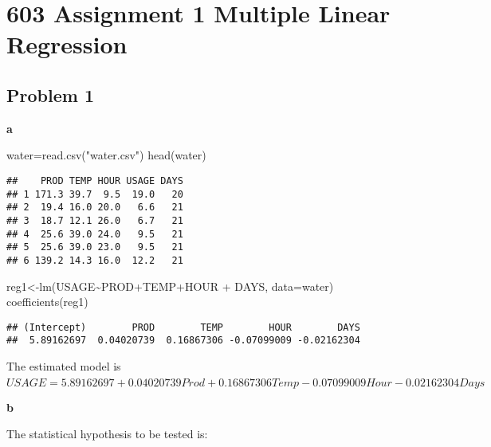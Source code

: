 \documentclass[
]{article}
\author{}
\date{\vspace{-2.5em}}
\newenvironment{Shaded}{\begin{snugshade}}{\end{snugshade}}
\newcommand{\AttributeTok}[1]{\textcolor[rgb]{0.77,0.63,0.00}{#1}}
\newcommand{\FunctionTok}[1]{\textcolor[rgb]{0.00,0.00,0.00}{#1}}
\newcommand{\NormalTok}[1]{#1}
\newcommand{\OtherTok}[1]{\textcolor[rgb]{0.56,0.35,0.01}{#1}}
\newcommand{\SpecialCharTok}[1]{\textcolor[rgb]{0.00,0.00,0.00}{#1}}
\newcommand{\StringTok}[1]{\textcolor[rgb]{0.31,0.60,0.02}{#1}}
\begin{document}
\hypertarget{assignment-1-multiple-linear-regression}{%
\section{603 Assignment 1 Multiple Linear
Regression}\label{assignment-1-multiple-linear-regression}}

\hypertarget{problem-1}{%
\subsection{Problem 1}\label{problem-1}}

\textbf{a}

\begin{Shaded}
\begin{Highlighting}[]
\NormalTok{water}\OtherTok{=}\FunctionTok{read.csv}\NormalTok{(}\StringTok{"water.csv"}\NormalTok{)}
\FunctionTok{head}\NormalTok{(water)}
\end{Highlighting}
\end{Shaded}

\begin{verbatim}
##    PROD TEMP HOUR USAGE DAYS
## 1 171.3 39.7  9.5  19.0   20
## 2  19.4 16.0 20.0   6.6   21
## 3  18.7 12.1 26.0   6.7   21
## 4  25.6 39.0 24.0   9.5   21
## 5  25.6 39.0 23.0   9.5   21
## 6 139.2 14.3 16.0  12.2   21
\end{verbatim}

\begin{Shaded}
\begin{Highlighting}[]
\NormalTok{reg1}\OtherTok{\textless{}{-}}\FunctionTok{lm}\NormalTok{(USAGE}\SpecialCharTok{\textasciitilde{}}\NormalTok{PROD}\SpecialCharTok{+}\NormalTok{TEMP}\SpecialCharTok{+}\NormalTok{HOUR }\SpecialCharTok{+}\NormalTok{ DAYS, }\AttributeTok{data=}\NormalTok{water)}
\FunctionTok{coefficients}\NormalTok{(reg1)}
\end{Highlighting}
\end{Shaded}

\begin{verbatim}
## (Intercept)        PROD        TEMP        HOUR        DAYS 
##  5.89162697  0.04020739  0.16867306 -0.07099009 -0.02162304
\end{verbatim}

The estimated model is
\(\hat{USAGE}= 5.89162697 +0.04020739Prod+0.16867306Temp-0.07099009Hour -0.02162304Days\)

\textbf{b}

The statistical hypothesis to be tested is:
\end{document}
